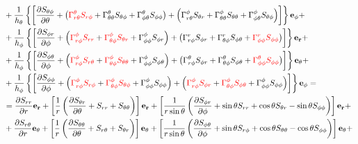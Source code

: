 \documentclass[11pt]{article}
\begin{document}
\begin{align}
& + \frac{1}{h_\theta} \left\{ \left[ \frac{\partial S_{\theta \phi}}{\partial \theta} + \left( {\color{red} \Gamma_{r\theta}^\theta S_{r\phi}} + \Gamma_{\theta \theta}^\theta S_{\theta \phi} + \Gamma_{\phi \theta}^\theta S_{\phi \phi} \right) + \left(\Gamma_{r\theta}^\phi S_{\theta r} + \Gamma_{\theta \theta}^\phi S_{\theta \theta} + \Gamma_{\phi \theta}^\phi S_{\theta \phi} \right) \right] \right\}{\bf{e_\phi}} + \\
& + \frac{1}{h_\phi} \left\{ \left[ \frac{\partial S_{\phi r}}{\partial \phi} + \left({\color{red} \Gamma_{r\phi}^\phi S_{rr}} + {\color{red} \Gamma_{\theta \phi}^\phi S_{\theta r}} + \Gamma_{\phi \phi}^\phi S_{\phi r} \right) + \left(\Gamma_{r\phi}^r S_{\phi r} + \Gamma_{\theta \phi}^r S_{\phi \theta} + {\color{red} \Gamma_{\phi \phi}^r S_{\phi \phi}} \right) \right] \right\}{\bf{e_r}} + \\
& + \frac{1}{h_\phi} \left\{ \left[ \frac{\partial S_{\phi \theta}}{\partial \phi} + \left( {\color{red} \Gamma_{r\phi}^\phi S_{r\theta}}  + {\color{red} \Gamma_{\theta \phi}^\phi S_{\theta \theta}} + \Gamma_{\phi \phi}^\phi S_{\phi \theta} \right) + \left(\Gamma_{r\phi}^\theta S_{\phi r} + \Gamma_{\theta \phi}^\theta S_{\phi \theta} + {\color{red} \Gamma_{\phi \phi}^\theta S_{\phi \phi}} \right) \right] \right\}{\bf{e_\theta}} + \\
& + \frac{1}{h_\phi} \left\{ \left[ \frac{\partial S_{\phi \phi}}{\partial \phi} + \left( {\color{red} \Gamma_{r\phi}^\phi S_{r\phi}} + {\color{red} \Gamma_{\theta \phi}^\phi S_{\theta \phi} } + \Gamma_{\phi \phi}^\phi S_{\phi \phi} \right) + \left( {\color{red} \Gamma_{r\phi}^\phi S_{\phi r}} + {\color{red} \Gamma_{\theta \phi}^\phi S_{\phi \theta} } + \Gamma_{\phi \phi}^\phi S_{\phi \phi} \right) \right] \right\}{\bf{e_\phi}} = \\ 
& = \frac{\partial S_{rr}}{\partial r}{\bf{e_r}} + \left[\frac{1}{r} \left( \frac{\partial S_{\theta r}}{\partial \theta} + S_{rr} + S_{\theta \theta} \right) \right]{\bf{e_r}} + \left[\frac{1}{r\sin{\theta}} \left(\frac{\partial S_{\phi r}}{\partial \phi} + \sin{\theta} S_{rr} + \cos{\theta}S_{\theta r} - \sin{\theta}S_{\phi \phi} \right) \right] {\bf{e_r}} + \\
& + \frac{\partial S_{r\theta}}{\partial r}{\bf{e_\theta}} + \left[\frac{1}{r} \left(\frac{\partial S_{\theta \theta}}{\partial \theta} + S_{r\theta} + S_{\theta r} \right) \right]{\bf{e_\theta}} + \left[\frac{1}{r\sin{\theta}} \left(\frac{\partial S_{\phi \theta}}{\partial \phi} + \sin{\theta}S_{r\phi} + \cos{\theta}S_{\theta \theta} - \cos{\theta} S_{\phi \phi} \right) \right]{\bf{e_\theta}} + \\

\end{align}
\end{document}
